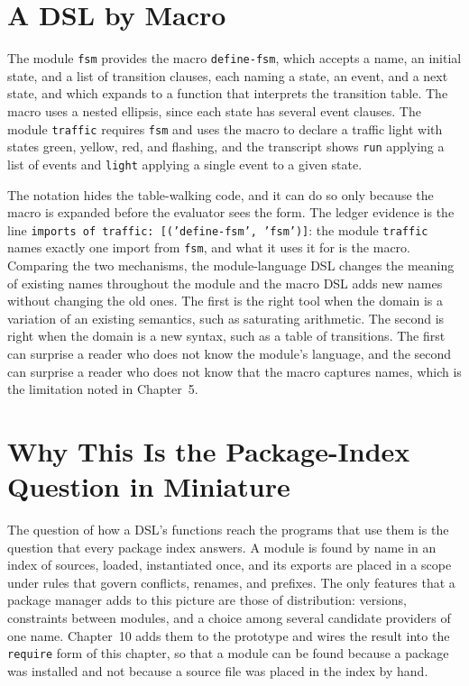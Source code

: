 \documentclass[11pt,oneside]{report}
\theoremstyle{plain}
\theoremstyle{definition}
\theoremstyle{remark}
\begin{document}
\section{A DSL by Macro}

The module \texttt{fsm} provides the macro \texttt{define-fsm}, which accepts a name, an initial state, and a list of transition clauses, each naming a state, an event, and a next state, and which expands to a function that interprets the transition table. The macro uses a nested ellipsis, since each state has several event clauses. The module \texttt{traffic} requires \texttt{fsm} and uses the macro to declare a traffic light with states green, yellow, red, and flashing, and the transcript shows \texttt{run} applying a list of events and \texttt{light} applying a single event to a given state.

The notation hides the table-walking code, and it can do so only because the macro is expanded before the evaluator sees the form. The ledger evidence is the line \texttt{imports of traffic: [('define-fsm', 'fsm')]}: the module \texttt{traffic} names exactly one import from \texttt{fsm}, and what it uses it for is the macro. Comparing the two mechanisms, the module-language DSL changes the meaning of existing names throughout the module and the macro DSL adds new names without changing the old ones. The first is the right tool when the domain is a variation of an existing semantics, such as saturating arithmetic. The second is right when the domain is a new syntax, such as a table of transitions. The first can surprise a reader who does not know the module's language, and the second can surprise a reader who does not know that the macro captures names, which is the limitation noted in Chapter~5.

\section{Why This Is the Package-Index Question in Miniature}

The question of how a DSL's functions reach the programs that use them is the question that every package index answers. A module is found by name in an index of sources, loaded, instantiated once, and its exports are placed in a scope under rules that govern conflicts, renames, and prefixes. The only features that a package manager adds to this picture are those of distribution: versions, constraints between modules, and a choice among several candidate providers of one name. Chapter~10 adds them to the prototype and wires the result into the \texttt{require} form of this chapter, so that a module can be found because a package was installed and not because a source file was placed in the index by hand.
\end{document}
